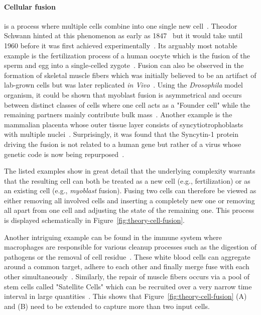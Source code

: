 \paragraph{Cellular fusion} is a process where multiple cells combine into one single new
cell~\cite{Ogle2004,Ogle2005,Whitlock2024}.
Theodor Schwann hinted at this phenomenon as early as 1847~\cite{Schwann1847} but it would take
until 1960 before it was first achieved experimentally~\cite{Barski1960}.
Its arguably most notable example is the fertilization process of a human oocyte which is the fusion
of the sperm and egg into a single-celled zygote~\cite{Cobb2012,Neaves2017,Primakoff2002}.
Fusion can also be observed in the formation of skeletal muscle fibers which was initially believed
to be an artifact of lab-grown cells but was later replicated \textit{in Vivo}~\cite{Mintz1967}.
Using the \textit{Drosophila} model organism, it could be shown that myoblast fusion is asymmetrical
and occurs between distinct classes of cells where one cell acts as a "Founder cell"
while the remaining partners mainly contribute bulk mass~\cite{Bate1990,Bour2000}.
Another example is the mammalian placenta whose outer tissue layer consists of
syncytiotrophoblasts with multiple nuclei~\cite{Midgley1963,Omata2013,Huppertz2011}.
Surprisingly, it was found that the Syncytin-1 protein driving the fusion is not related to
a human gene but rather of a virus whose genetic code is now being
repurposed~\cite{Mi2000,Dupressoir2009}.

The listed examples show in great detail that the underlying complexity warrants that the resulting
cell can both be treated as a new cell (e.g., fertilization) or as an existing cell (e.g.,
\textit{myoblast} fusion).
Fusing two cells can therefore be viewed as either removing all involved cells and inserting a
completely new one or removing all apart from one cell and adjusting the state of the remaining one.
This process is displayed schematically in Figure~\ref{fig:theory-cell-fusion}.

Another intriguing example can be found in the immune system where macrophages are responsible for
various cleanup processes such as the digestion of pathogens or the removal of cell
residue~\cite{Metchnikoff1892,Rather1970}.
These white blood cells can aggregate around a common target, adhere to each other and finally merge
fuse with each other simultaneously~\cite{Vignery2005,Helming2008}.
Similarly, the repair of muscle fibers occurs via a pool of stem cells called "Satellite Cells"
which can be recruited over a very narrow time interval in large quantities~\cite{Abmayr2012}.
This shows that Figure~\ref{fig:theory-cell-fusion} (A) and (B) need to be extended to capture
more than two input cells.

